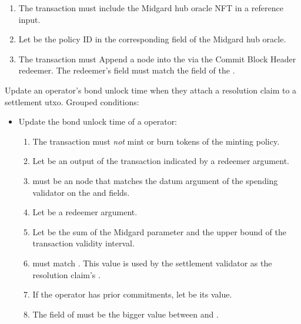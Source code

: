 \documentclass[../midgard.tex]{subfiles}
\begin{document}
\begin{description}
\begin{itemize}
            \begin{enumerate}[resume]
                \item The transaction must include the Midgard hub oracle NFT in a reference input.
                \item Let  be the policy ID in the corresponding field of the Midgard hub oracle.
                \item The transaction must Append a node into the  via the Commit Block Header redeemer.
                  The redeemer's  field must match the  field of the .
            \end{enumerate}
        \end{itemize}
    \item[Update Bond Hold New Settlement.] Update an operator's bond unlock time when they attach a resolution claim to a settlement utxo.
      Grouped conditions:
        \begin{itemize}
            \item Update the bond unlock time of a operator:
            \begin{enumerate} 
                \item The transaction must \emph{not} mint or burn tokens of the  minting policy.
                \item Let  be an output of the transaction indicated by a redeemer argument.
                \item {} must be an  node that matches the datum argument of the spending validator on the  and  fields.
                \item Let  be a redeemer argument.
                \item Let  be the sum of the Midgard  parameter and the upper bound of the transaction validity interval.
                \item {} must match .
                  This value is used by the settlement validator as the resolution claim's .
                \item If the operator has prior commitments, let  be its value.
                \item The  field of  must be the bigger value between  and .

\end{enumerate}
\end{itemize}
\end{description}
\end{document}
